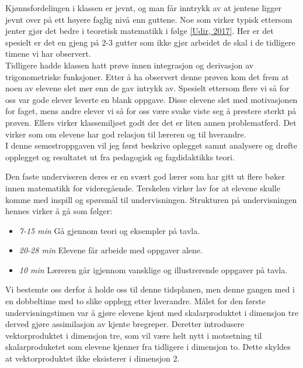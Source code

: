 \documentclass[11pt]{article}
\begin{document}
Kjønnsfordelingen i klassen er jevnt, og man får inntrykk av at jentene ligger jevnt over på ett høyere faglig nivå enn guttene. Noe som virker typisk ettersom jenter gjør det bedre i teoretisk matematikk i følge \href{https://www.udir.no/tall-og-forskning/finn-forskning/tema/karakterer/eksamenskarakterer-varen-2017/}{[Udir, 2017]}. Her er det spesielt er det en gjeng på 2-3 gutter som ikke gjør arbeidet de skal i de tidligere timene vi har observert. \\

Tidligere hadde klassen hatt prøve innen integrasjon og derivasjon av trigonometriske funksjoner. Etter å ha observert denne prøven kom det frem at noen av elevene slet mer enn de gav intrykk av. Spesielt ettersom flere vi så for oss var gode elever leverte en blank oppgave. Disse elevene slet med motivasjonen for faget, mens andre elever vi så for oss være svake viste seg å prestere sterkt på prøven.
Ellers virker klassemiljøet godt der det er liten annen problematferd. Det virker som om elevene har god relasjon til læreren og til hverandre.\\

I denne semestroppgaven vil jeg først beskrive oplegget samnt analysere og drøfte opplegget og resultatet ut fra pedagogisk og fagdidaktikks teori.

Den faste underviseren deres er en svært god lærer som har gitt ut flere bøker innen matematikk for videregående. Terskelen virker lav for at elevene skulle  komme med inspill og spørsmål til undervisningen. 
Strukturen på undervisningen hennes virker å gå som følger:
\begin{itemize}
\item \emph{7-15 min} Gå gjennom teori og eksempler på tavla.
\item \emph{20-28 min} Elevene får arbeide med oppgaver alene.
\item \emph{10 min} Læreren går igjennom vansklige og illustrerende oppgaver på tavla.
\end{itemize}
Vi bestemte oss derfor å holde oss til denne tidsplanen, men denne gangen med i en dobbeltime med to slike opplegg etter hverandre. Målet for den første undervisningstimen var å gjøre elevene kjent med skalarproduktet i dimensjon tre derved gjøre assimilasjon \citep{Saljo} av kjente bregreper. Deretter introdusere vektorproduktet i dimensjon tre, som vil være helt nytt i motsetning til skalarproduketet som elevene kjenner fra tidligere i dimensjon to. Dette skyldes at vektorproduktet ikke eksisterer i dimensjon 2.\\
\end{document}
